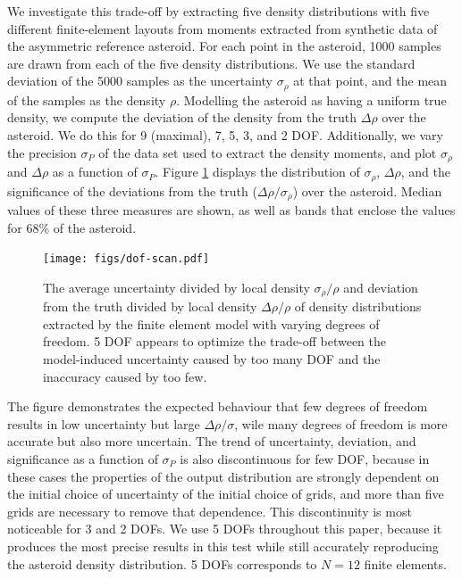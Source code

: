 \documentclass[fleqn,usenatbib]{mnras}
\begin{document}
We investigate this trade-off by extracting five density distributions with five different finite-element layouts from moments extracted from synthetic data of the asymmetric reference asteroid. For each point in the asteroid, 1000 samples are drawn from each of the five density distributions. We use the standard deviation of the 5000 samples as the uncertainty $\sigma_\rho$ at that point, and the mean of the samples as the density $\rho$. Modelling the asteroid as having a uniform true density, we compute the deviation of the density from the truth $\Delta \rho$ over the asteroid. We do this for 9 (maximal), 7, 5, 3, and 2 DOF. Additionally, we vary the precision $\sigma_P$ of the data set used to extract the density moments, and plot $\sigma_\rho$ and $\Delta \rho$ as a function of $\sigma_P$. Figure \ref{fig:dof-scan} displays the distribution of $\sigma_\rho$, $\Delta \rho$, and the significance of the deviations from the truth ($\Delta \rho / \sigma_\rho$) over the asteroid. Median values of these three measures are shown, as well as bands that enclose the values for 68\% of the asteroid.

\begin{figure}
  \texttt{[image: figs/dof-scan.pdf]}
  \caption{The average uncertainty divided by local density $\sigma_\rho / \rho$ and deviation from the truth divided by local density $\Delta \rho / \rho$ of density distributions extracted by the finite element model with varying degrees of freedom. 5 DOF appears to optimize the trade-off between the model-induced uncertainty caused by too many DOF and the inaccuracy caused by too few.}
  \label{fig:dof-scan}
\end{figure}

The figure demonstrates the expected behaviour that few degrees of freedom results in low uncertainty but large $\Delta \rho / \sigma$, wile many degrees of freedom is more accurate but also more uncertain. The trend of uncertainty, deviation, and significance as a function of $\sigma_P$ is also discontinuous for few DOF, because in these cases the properties of the output distribution are strongly dependent on the initial choice of uncertainty of the initial choice of grids, and more than five grids are necessary to remove that dependence. This discontinuity is most noticeable for 3 and 2 DOFs. We use 5 DOFs throughout this paper, because it produces the most precise results in this test while still accurately reproducing the asteroid density distribution. 5 DOFs corresponds to $N=12$ finite elements.
\end{document}

